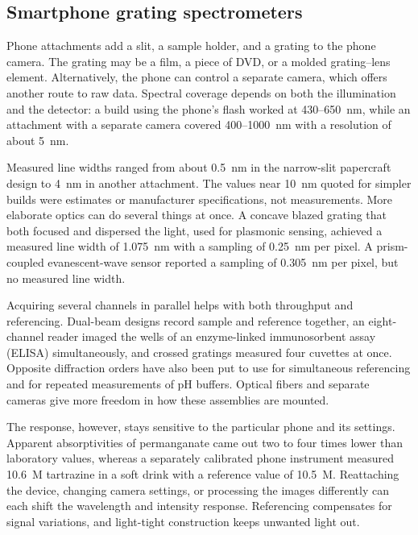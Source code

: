 \subsection{Smartphone grating spectrometers}

Phone attachments add a slit, a sample holder, and a grating to the phone camera. The grating may be a film, a piece of DVD, or a molded grating--lens element.\citep{grasse2015teaching,wang2016smartphone,zhang2016g} Alternatively, the phone can control a separate camera, which offers another route to raw data.\citep{edwards2017smartphone} Spectral coverage depends on both the illumination and the detector: a build using the phone's flash worked at 430--650~nm,\citep{wang2016smartphoneb} while an attachment with a separate camera covered 400--1000~nm with a resolution of about 5~nm.\citep{edwards2017smartphone}

Measured line widths ranged from about 0.5~nm in the narrow-slit papercraft design to 4~nm in another attachment.\citep{ju2020fabrication,markvart2020continuous} The values near 10~nm quoted for simpler builds were estimates or manufacturer specifications, not measurements.\citep{nguyen2025portable,silva2022smartphone} More elaborate optics can do several things at once. A concave blazed grating that both focused and dispersed the light, used for plasmonic sensing, achieved a measured line width of 1.075~nm with a sampling of 0.25~nm per pixel.\citep{lo2019concave} A prism-coupled evanescent-wave sensor reported a sampling of 0.305~nm per pixel, but no measured line width.\citep{dutta2014evanescent}

Acquiring several channels in parallel helps with both throughput and referencing. Dual-beam designs record sample and reference together,\citep{bogucki2019d,feng2021open} an eight-channel reader imaged the wells of an enzyme-linked immunosorbent assay (ELISA) simultaneously,\citep{wang2018ultra} and crossed gratings measured four cuvettes at once.\citep{biswas2022simultaneous} Opposite diffraction orders have also been put to use for simultaneous referencing and for repeated measurements of pH buffers.\citep{biswas2020multichannel} Optical fibers and separate cameras give more freedom in how these assemblies are mounted.\citep{long2017multimode,woodburn2019analysis,edwards2017smartphone}

The response, however, stays sensitive to the particular phone and its settings. Apparent absorptivities of permanganate came out two to four times lower than laboratory values,\citep{bruininks2022inexpensive} whereas a separately calibrated phone instrument measured 10.6~\textmu M tartrazine in a soft drink with a reference value of 10.5~\textmu M.\citep{nguyen2025portable} Reattaching the device, changing camera settings, or processing the images differently can each shift the wavelength and intensity response.\citep{markvart2020continuous,vidal2021use,matinrad2020systematic} Referencing compensates for signal variations, and light-tight construction keeps unwanted light out.\citep{bogucki2019d,nguyen2025portable,feng2021open}

